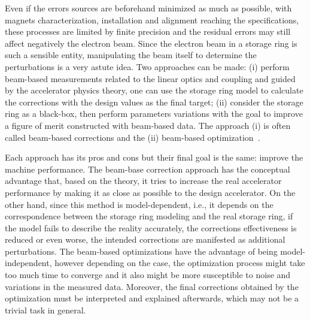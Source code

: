 Even if the errors sources are beforehand minimized as much as possible, with magnets characterization, installation and alignment reaching the specifications, these processes are limited by finite precision and the residual errors may still affect negatively the electron beam. Since the electron beam in a storage ring is such a sensible entity, manipulating the beam itself to determine the perturbations is a very astute idea. Two approaches can be made: (i) perform beam-based measurements related to the linear optics and coupling and guided by the accelerator physics theory, one can use the storage ring model to calculate the corrections with the design values as the final target; (ii) consider the storage ring as a black-box, then perform parameters variations with the goal to improve a figure of merit constructed with beam-based data. The approach (i) is often called beam-based corrections and the (ii) beam-based optimization~\cite{huang2019beam}.


Each approach has its pros and cons but their final goal is the same: improve the machine performance. The beam-base correction approach has the conceptual advantage that, based on the theory, it tries to increase the real accelerator performance by making it as close as possible to the design accelerator. On the other hand, since this method is model-dependent, i.e., it depends on the correspondence between the storage ring modeling and the real storage ring, if the model fails to describe the reality accurately, the corrections effectiveness is reduced or even worse, the intended corrections are manifested as additional perturbations. The beam-based optimizations have the advantage of being model-independent, however depending on the case, the optimization process might take too much time to converge and it also might be more susceptible to noise and variations in the measured data. Moreover, the final corrections obtained by the optimization must be interpreted and explained afterwards, which may not be a trivial task in general.


